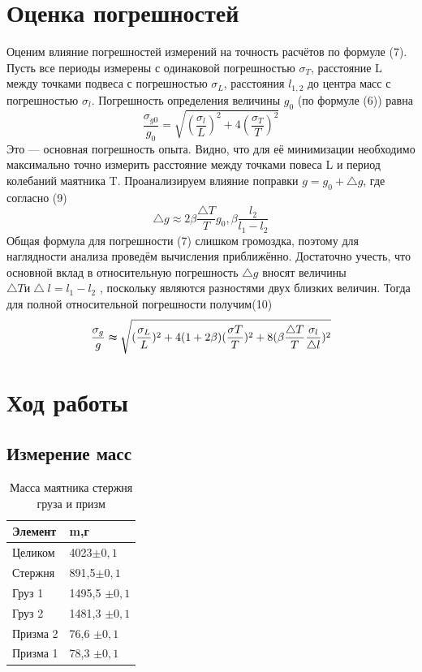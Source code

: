 \documentclass[a4paper]{article}
\begin{document}
\section{Оценка погрешностей}
Оценим влияние погрешностей измерений на точность расчётов по формуле (7). Пусть все периоды измерены с одинаковой погрешностью $\sigma_{T}$, 
расстояние L между точками подвеса с погрешностью $\sigma_{L}$, расстояния $l_{1,2}$
до центра масс с погрешностью $\sigma_{l}$. Погрешность определения величины $g_{0}$
(по формуле (6)) равна
\[\frac{\sigma_{g0}}{g_{0}}=\sqrt{(\frac{\sigma_{l}}{L} )^2+4(\frac{\sigma_{T} }{T} )^2}\]
Это — основная погрешность опыта. Видно, что для её минимизации необходимо максимально точно измерить расстояние между точками повеса L
и период колебаний маятника T.
Проанализируем влияние поправки $g= g_{0}+\bigtriangleup g$, где согласно (9)  
\[\bigtriangleup g\approx 2\beta \frac{\bigtriangleup T}{T}g_{0}, \beta \frac{l_{2}}{l_{1}-l_{2}}\] 
Общая формула для погрешности (7) слишком громоздка, поэтому для 
наглядности анализа проведём вычисления приближённо. Достаточно учесть, что основной вклад в относительную погрешность $\bigtriangleup g$ вносят величины $\bigtriangleup T \text{и} \bigtriangleup l = l_{1}-l_{2}$ , поскольку являются разностями двух близких величин.
Тогда для полной относительной погрешности получим(10)
\[\frac{ \sigma_{g}}{g}\thickapprox \sqrt{(\frac{\sigma_{L}}{L} )^2+ 4(1+2\beta)(\frac{\sigma T}{T} )^2+8(\beta \frac{\bigtriangleup T}{T}\frac{\sigma_{l}}{\bigtriangleup l})^2}\]

\section{{Ход работы}}
\subsection{Измерение масс}

\begin{table}[!h]
    \begin{center}
    \begin{tabular}{|l|l|}
    \hline
    Элемент & m,г \\ \hline
    Целиком                        & 4023$\pm 0,1$                      \\ \hline
    Стержня                        & 891,5$\pm 0,1$                    \\ \hline
    Груз 1                        & 1495,5 $\pm 0,1$                    \\ \hline
    Груз 2                        & 1481,3 $\pm 0,1$                    \\ \hline
    Призма 2                        & 76,6 $\pm 0,1$                    \\ \hline
    Призма 1                        & 78,3 $\pm 0,1$                     \\ \hline
    \end{tabular}
    \caption{Масса маятника стержня груза и призм}
    \end{center}
    \end{table}
\end{document}
